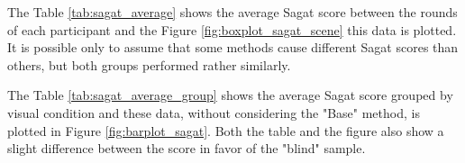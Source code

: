 The Table \ref{tab:sagat_average} shows the average Sagat score between the rounds of each participant and the Figure \ref{fig:boxplot_sagat_scene} this data is plotted. It is possible only to assume that some methods cause different Sagat scores than others, but both groups performed rather similarly.



%    

The Table \ref{tab:sagat_average_group} shows the average Sagat score grouped by visual condition and these data, without considering the "Base" method, is plotted in Figure \ref{fig:barplot_sagat}. Both the table and the figure also show a slight difference between the score in favor of the "blind" sample.



%    

